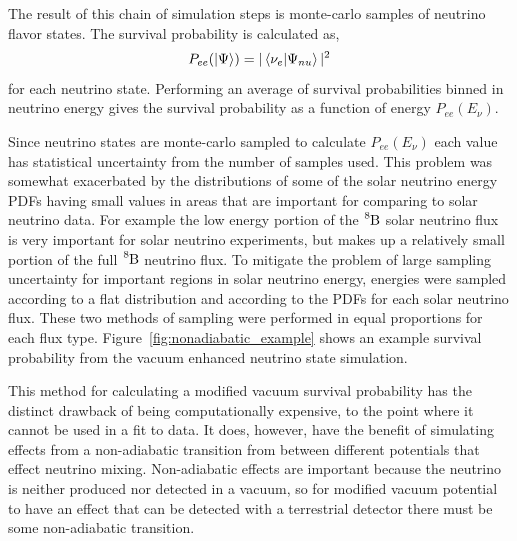 The result of this chain of simulation steps is monte-carlo samples
of neutrino flavor states. The survival probability is calculated as,
\begin{equation}
P_{ee}(\ket{\Psi}) = |\braket{\nu_{e}}{\Psi_{nu}}|^2
\end{equation}
for each neutrino state.
Performing an average of survival probabilities binned in neutrino energy 
gives the survival probability as a function of energy $P_{ee}(E_{\nu})$.

Since neutrino states are monte-carlo sampled to calculate $P_{ee}(E_{\nu})$
each value has statistical uncertainty from the number of samples used.
This problem was somewhat exacerbated by the distributions of some of the
solar neutrino energy PDFs having small values in areas that are important for
comparing to solar neutrino data. For example the low energy portion of the
$\ce{^{8}B}$ solar neutrino flux is very important for solar neutrino experiments,
but makes up a relatively small portion of the full $\ce{^{8}B}$ neutrino flux.
To mitigate the problem of large sampling uncertainty for important regions in
solar neutrino energy, energies were sampled according to a flat distribution
and according to the PDFs for each solar neutrino flux. These two methods of sampling
were performed in equal proportions for each flux type.
Figure~\ref{fig:nonadiabatic_example} shows an example survival probability
from the vacuum enhanced neutrino state simulation.

This method for calculating a modified vacuum survival probability has the
distinct drawback of being computationally expensive, to the point
where it cannot be used in a fit to data.
It does, however, have the benefit of simulating effects from a non-adiabatic
transition from between different potentials that effect neutrino mixing.
Non-adiabatic effects are important because the neutrino is neither produced nor
detected in a vacuum, so for modified vacuum potential to have an effect
that can be detected with a terrestrial detector there must be some
non-adiabatic transition.


